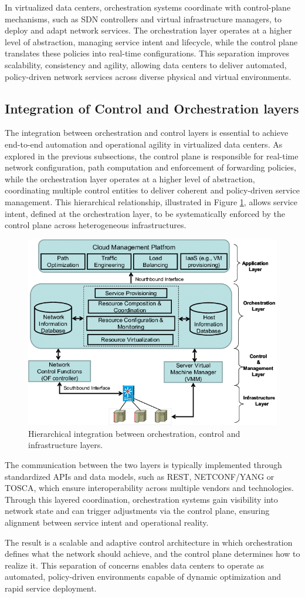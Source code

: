 In virtualized data centers, orchestration systems coordinate with control-plane mechanisms, such as SDN controllers and virtual infrastructure managers, to deploy and adapt network services. The orchestration layer operates at a higher level of abstraction, managing service intent and lifecycle, while the control plane translates these policies into real-time configurations. This separation improves scalability, consistency and agility, allowing data centers to deliver automated, policy-driven network services across diverse physical and virtual environments.

\subsection{Integration of Control and Orchestration layers}

The integration between orchestration and control layers is essential to achieve end-to-end automation and operational agility in virtualized data centers. As explored in the previous subsections, the control plane is responsible for real-time network configuration, path computation and enforcement of forwarding policies, while the orchestration layer operates at a higher level of abstraction, coordinating multiple control entities to deliver coherent and policy-driven service management. This hierarchical relationship, illustrated in Figure \ref{layerIntegration}, allows service intent, defined at the orchestration layer, to be systematically enforced by the control plane across heterogeneous infrastructures.

\begin{figure}[H]
    \centering
    \vspace{-5pt}
    \includegraphics[width=0.5\linewidth]{Figures/layerIntegration.png}
    \caption{Hierarchical integration between orchestration, control and infrastructure layers. \cite{adami2015orchestrator}}
    \label{layerIntegration}
\end{figure}
\newpage
The communication between the two layers is typically implemented through standardized APIs and data models, such as REST, NETCONF/YANG or TOSCA, which ensure interoperability across multiple vendors and technologies. Through this layered coordination, orchestration systems gain visibility into network state and can trigger adjustments via the control plane, ensuring alignment between service intent and operational reality.

The result is a scalable and adaptive control architecture in which orchestration defines what the network should achieve, and the control plane determines how to realize it. This separation of concerns enables data centers to operate as automated, policy-driven environments capable of dynamic optimization and rapid service deployment.